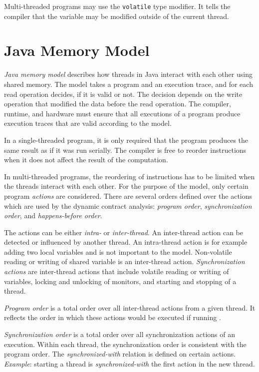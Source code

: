 Multi-threaded programs may use the \texttt{volatile} type modifier. It tells
the compiler that the variable may be modified outside of the current thread.

\section{Java Memory Model}


\emph{Java memory model} describes how threads in Java interact with each other
using shared memory. The model takes a program and an execution trace, and for
each read operation decides, if it is valid or not. The decision depends on the
write operation that modified the data before the read operation. The compiler,
runtime, and hardware must ensure that all executions of a program produce
execution traces that are valid according to the model.

In a single-threaded program, it is only required that the program produces the
same result as if it was run serially. The compiler is free to reorder
instructions when it does not affect the result of the computation.

In multi-threaded programs, the reordering of instructions has to be limited
when the threads interact with each other. For the purpose of the model, only
certain program \emph{actions} are considered. There are several orders defined
over the actions which are used by the dynamic contract analysis: \emph{program
order}, \emph{synchronization order}, and \emph{happens-before order}.

The actions can be either \emph{intra-} or \emph{inter-thread}. An inter-thread
action can be detected or influenced by another thread. An intra-thread action
is for example adding two local variables and is not important to the model.
Non-volatile reading or writing of shared variable is an inter-thread action.
\emph{Synchronization actions} are inter-thread actions that include volatile
reading or writing of variables, locking and unlocking of monitors, and starting
and stopping of a thread.

\emph{Program order} is a total order over all inter-thread actions from a given
thread. It reflects the order in which these actions would be executed if
running \todo{} .

\emph{Synchronization order} is a total order over all synchronization actions
of an execution. Within each thread, the synchronization order is consistent
with the program order. The \emph{synchronized-with} relation is defined on
certain actions. \emph{Example}: starting a thread is \emph{synchronized-with}
the first action in the new thread.

